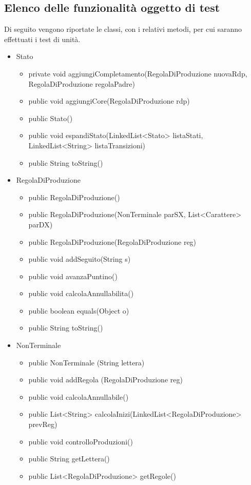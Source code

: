 \documentclass[12pt]{article}
\begin{document}
\subsection{Elenco delle funzionalità oggetto di test}
Di seguito vengono riportate le classi, con i relativi metodi, per cui saranno effettuati i test di unità.
\begin{itemize}
\item Stato
\begin{itemize}
\item private void aggiungiCompletamento(RegolaDiProduzione nuovaRdp, RegolaDiProduzione regolaPadre)
\item public void aggiungiCore(RegolaDiProduzione rdp)
\item public Stato()
\item public void espandiStato(LinkedList<Stato> listaStati, LinkedList<String> listaTransizioni)
\item public String toString()
\end{itemize}
\item RegolaDiProduzione
\begin{itemize}
\item public RegolaDiProduzione()
\item public RegolaDiProduzione(NonTerminale parSX, List<Carattere> parDX)
\item public RegolaDiProduzione(RegolaDiProduzione reg)
\item public void addSeguito(String s)
\item public void avanzaPuntino()
\item public void calcolaAnnullabilita()
\item public boolean equals(Object o)
\item public String toString()
\end{itemize}
\item NonTerminale
\begin{itemize}
\item public NonTerminale (String lettera)
\item public void addRegola (RegolaDiProduzione reg)
\item public void calcolaAnnullabile()
\item public List<String> calcolaInizi(LinkedList<RegolaDiProduzione> prevReg)
\item public void controlloProduzioni()
\item public String getLettera()
\item public List<RegolaDiProduzione> getRegole()

\end{itemize}
\end{itemize}
\end{document}
